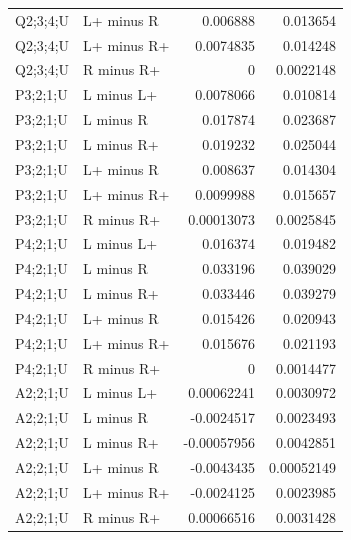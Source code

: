 {\begin{longtable}{@{}llrr@{}}
Q2;3;4;U & L+ minus R & 0.006888 & 0.013654 \\
Q2;3;4;U & L+ minus R+ & 0.0074835 & 0.014248 \\
Q2;3;4;U & R minus R+ & 0 & 0.0022148 \\
P3;2;1;U & L minus L+ & 0.0078066 & 0.010814 \\
P3;2;1;U & L minus R & 0.017874 & 0.023687 \\
P3;2;1;U & L minus R+ & 0.019232 & 0.025044 \\
P3;2;1;U & L+ minus R & 0.008637 & 0.014304 \\
P3;2;1;U & L+ minus R+ & 0.0099988 & 0.015657 \\
P3;2;1;U & R minus R+ & 0.00013073 & 0.0025845 \\
P4;2;1;U & L minus L+ & 0.016374 & 0.019482 \\
P4;2;1;U & L minus R & 0.033196 & 0.039029 \\
P4;2;1;U & L minus R+ & 0.033446 & 0.039279 \\
P4;2;1;U & L+ minus R & 0.015426 & 0.020943 \\
P4;2;1;U & L+ minus R+ & 0.015676 & 0.021193 \\
P4;2;1;U & R minus R+ & 0 & 0.0014477 \\
A2;2;1;U & L minus L+ & 0.00062241 & 0.0030972 \\
A2;2;1;U & L minus R & -0.0024517 & 0.0023493 \\
A2;2;1;U & L minus R+ & -0.00057956 & 0.0042851 \\
A2;2;1;U & L+ minus R & -0.0043435 & 0.00052149 \\
A2;2;1;U & L+ minus R+ & -0.0024125 & 0.0023985 \\
A2;2;1;U & R minus R+ & 0.00066516 & 0.0031428 \\
\end{longtable}
}
